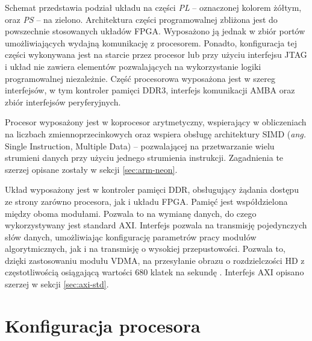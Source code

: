 Schemat przedstawia podział układu na części \emph{PL} -- oznaczonej kolorem żółtym, oraz \emph{PS} -- na zielono.
Architektura części programowalnej zbliżona jest do powszechnie stosowanych układów FPGA. %
Wyposażono ją jednak w zbiór portów umożliwiających wydajną komunikację z procesorem. 
Ponadto, konfiguracja tej części wykonywana jest na starcie przez procesor lub przy użyciu interfejsu JTAG i układ nie zawiera elementów pozwalających na wykorzystanie logiki programowalnej niezależnie.
Część procesorowa wyposażona jest w szereg interfejsów, w tym kontroler pamięci DDR3, interfejs komunikacji AMBA oraz zbiór interfejsów peryferyjnych.

Procesor wyposażony jest w koprocesor arytmetyczny, wspierający w obliczeniach na liczbach zmiennoprzecinkowych oraz wspiera obsługę architektury SIMD (\emph{ang.} Single Instruction, Multiple Data) -- pozwalającej na przetwarzanie wielu strumieni danych przy użyciu jednego strumienia instrukcji. 
Zagadnienia te szerzej opisane zostały w sekcji \ref{sec:arm-neon}.

Układ wyposażony jest w kontroler pamięci DDR, obsługujący żądania dostępu ze strony zarówno procesora, jak i układu FPGA. %
Pamięć jest współdzielona między oboma modułami. %
Pozwala to na wymianę danych, do czego wykorzystywany jest standard AXI. 
Interfejs pozwala na transmisję pojedynczych słów danych, umożliwiając konfigurację parametrów pracy modułów algorytmicznych, jak i na transmisję o wysokiej przepustowości. 
Pozwala to, dzięki zastosowaniu modułu VDMA, na przesyłanie obrazu o rozdzielczości HD z częstotliwością osiągającą wartości 680 klatek na sekundę  \cite{axi-vdma-guide}. 
Interfejs AXI opisano szerzej w sekcji \ref{sec:axi-std}.




\section{Konfiguracja procesora}
\label{sec:arm-programming}

